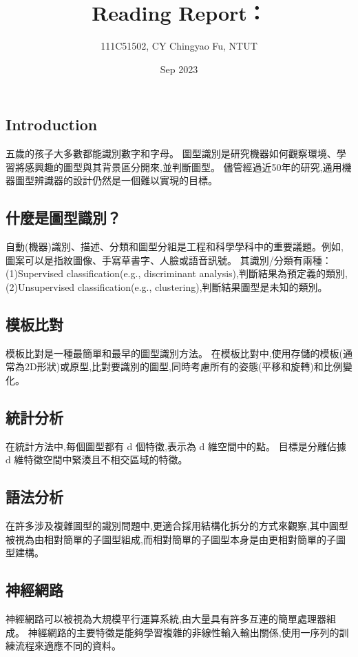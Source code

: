 \documentclass[10pt, a4paper]{article}
\title{Reading Report： \href{\myurl}{\mytitle}}
\author{111C51502, CY Chingyao Fu, NTUT }
\date{Sep 2023}
\begin{document}
\begin{CJK*}{UTF8}{bsmi}

\maketitle

\section{Introduction}
五歲的孩子大多數都能識別數字和字母。
圖型識別是研究機器如何觀察環境、學習將感興趣的圖型與其背景區分開來,並判斷圖型。 
儘管經過近50年的研究,通用機器圖型辨識器的設計仍然是一個難以實現的目標。
\subsection{什麼是圖型識別？}
自動(機器)識別、描述、分類和圖型分組是工程和科學學科中的重要議題。例如,圖案可以是指紋圖像、手寫草書字、人臉或語音訊號。 
其識別/分類有兩種： 
(1)Supervised classification(e.g., discriminant analysis),判斷結果為預定義的類別,
(2)Unsupervised classification(e.g., clustering),判斷結果圖型是未知的類別。
\subsection{模板比對}
模板比對是一種最簡單和最早的圖型識別方法。
在模板比對中,使用存儲的模板(通常為2D形狀)或原型,比對要識別的圖型,同時考慮所有的姿態(平移和旋轉)和比例變化。
\subsection{統計分析}
在統計方法中,每個圖型都有 d 個特徵,表示為 d 維空間中的點。 目標是分離佔據 d 維特徵空間中緊湊且不相交區域的特徵。
\subsection{語法分析}
在許多涉及複雜圖型的識別問題中,更適合採用結構化拆分的方式來觀察,其中圖型被視為由相對簡單的子圖型組成,而相對簡單的子圖型本身是由更相對簡單的子圖型建構。
\subsection{神經網路}
神經網路可以被視為大規模平行運算系統,由大量具有許多互連的簡單處理器組成。
神經網路的主要特徵是能夠學習複雜的非線性輸入輸出關係,使用一序列的訓練流程來適應不同的資料。


\end{CJK*}
\end{document}

